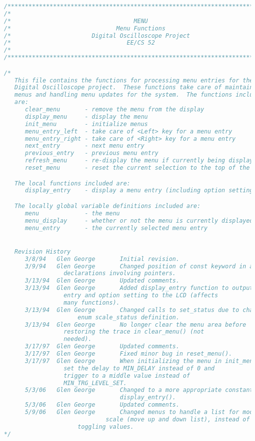 \begin{lstlisting}[language=C]
/****************************************************************************/
/*                                                                          */
/*                                   MENU                                   */
/*                              Menu Functions                              */
/*                       Digital Oscilloscope Project                       */
/*                                 EE/CS 52                                 */
/*                                                                          */
/****************************************************************************/

/*
   This file contains the functions for processing menu entries for the
   Digital Oscilloscope project.  These functions take care of maintaining the
   menus and handling menu updates for the system.  The functions included
   are:
      clear_menu       - remove the menu from the display
      display_menu     - display the menu
      init_menu        - initialize menus
      menu_entry_left  - take care of <Left> key for a menu entry
      menu_entry_right - take care of <Right> key for a menu entry
      next_entry       - next menu entry
      previous_entry   - previous menu entry
      refresh_menu     - re-display the menu if currently being displayed
      reset_menu       - reset the current selection to the top of the menu

   The local functions included are:
      display_entry    - display a menu entry (including option setting)

   The locally global variable definitions included are:
      menu             - the menu
      menu_display     - whether or not the menu is currently displayed
      menu_entry       - the currently selected menu entry


   Revision History
      3/8/94   Glen George       Initial revision.
      3/9/94   Glen George       Changed position of const keyword in array
				 declarations involving pointers.
      3/13/94  Glen George       Updated comments.
      3/13/94  Glen George       Added display_entry function to output a menu
				 entry and option setting to the LCD (affects
				 many functions).
      3/13/94  Glen George       Changed calls to set_status due to changing
      				 enum scale_status definition.
      3/13/94  Glen George       No longer clear the menu area before
				 restoring the trace in clear_menu() (not
				 needed).
      3/17/97  Glen George       Updated comments.
      3/17/97  Glen George       Fixed minor bug in reset_menu().
      3/17/97  Glen George       When initializing the menu in init_menu(),
				 set the delay to MIN_DELAY instead of 0 and
				 trigger to a middle value instead of
				 MIN_TRG_LEVEL_SET.
      5/3/06   Glen George       Changed to a more appropriate constant in
                                 display_entry().
      5/3/06   Glen George       Updated comments.
      5/9/06   Glen George       Changed menus to handle a list for mode and
	                         scale (move up and down list), instead of
			         toggling values.
*/




\end{lstlisting}
